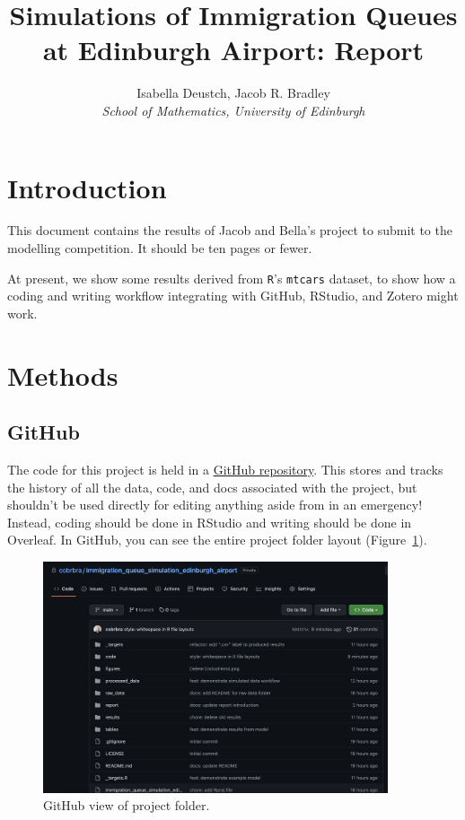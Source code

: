\documentclass[12pt]{article}
\title{Simulations of Immigration Queues at Edinburgh Airport: Report}
\author{Isabella Deustch, Jacob R. Bradley
 \\ \emph{School of Mathematics, University of Edinburgh}}
\begin{document}
\maketitle

\section{Introduction}
This document contains the results of Jacob and Bella's project to submit to the modelling competition. It should be ten pages or fewer. 

At present, we show some results derived from \texttt{R}'s \texttt{mtcars} dataset, to show how a coding and writing workflow integrating with GitHub, RStudio, and Zotero might work.

\section{Methods}
\subsection{GitHub}
The code for this project is held in a \href{https://github.com/cobrbra/immigration_queue_simulation_edinburgh_airport}{GitHub repository}. This stores and tracks the history of all the data, code, and docs associated with the project, but shouldn't be used directly for editing anything aside from in an emergency! Instead, coding should be done in RStudio and writing should be done in Overleaf. In GitHub, you can see the entire project folder layout (Figure~\ref{fig:github_overview}).

\begin{figure}[htbp]
    \centering
    \includegraphics[width=4in]{figures/github_overview.png}
    \caption{GitHub view of project folder.}
    \label{fig:github_overview}
\end{figure}
\end{document}
